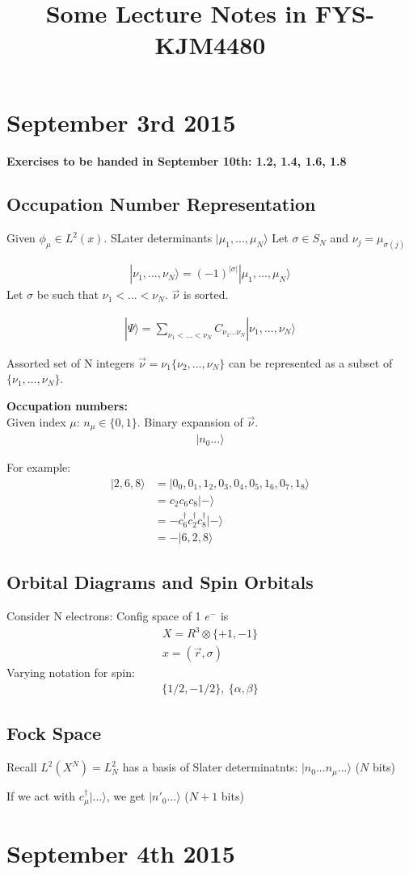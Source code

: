 \documentclass[norsk, 12pt]{article}
\title{Some Lecture Notes in FYS-KJM4480}
\begin{document}
\section{September 3rd 2015}
\label{sec:1}
\textbf{Exercises to be handed in September 10th: 1.2, 1.4, 1.6, 1.8}
\subsection{Occupation Number Representation}
\label{sub:1}
Given $\phi_{\mu} \in L^2(x)$. SLater determinants $|\mu_1,...,\mu_N\rangle$
Let $\sigma \in S_N$ and $\nu_j = \mu_{\sigma(j)}$

\begin{align*}
	|\nu_1, ..., \nu_N\rangle = (-1)^{|\sigma|} |\mu_1,...,\mu_N\rangle
\end{align*}
Let $\sigma$ be such that $\nu_1<...<\nu_N$. $\vec \nu$ is sorted.

\begin{align*}
	|\Psi\rangle = \sum_{\nu_1<...<\nu_N}^{}C_{\nu_1...\nu_N}|\nu_1,...,\nu_N\rangle
\end{align*}

Assorted set of N integers $\vec \nu = \nu_1\{ \nu_2,...,\nu_N \}$
can be represented as a subset of $\{\nu_1,...,\nu_N\}$.

\textbf{Occupation numbers:}\\
Given index $\mu$: $n_{\mu}\in \{ 0,1 \}$. Binary expansion of $\vec \nu$.
\begin{align*}
	|n_0 ...\rangle
\end{align*}

For example:\\
\begin{align*}
	|2,6,8\rangle &= |0_0, 0_1, 1_2, 0_3, 0_4, 0_5, 1_6, 0_7, 1_8\rangle\\
	&= c_2 c_6 c_8|-\rangle\\
	&= -c_6^{\dagger} c_2^{\dagger} c_8^{\dagger}|-\rangle\\
	&=-|6,2,8\rangle
\end{align*}
\subsection{Orbital Diagrams and Spin Orbitals}
\label{sub:}
Consider N electrons: Config space of 1 $e^-$ is
\begin{align*}
	X = R^3 \otimes \{ +1, -1 \}\\
	x = (\vec r, \sigma)
\end{align*}
Varying notation for spin:
\begin{align*}
	\{ 1/2, -1/2\},\: \{\alpha, \beta \}
\end{align*}

\subsection{Fock Space}
Recall $L^2(X^N) = L^2_N$ has a basis of Slater determinatnts: $|n_0...n_{\mu}...\rangle$ ($N$ bits)

If we act with $c^{\dagger}_{\mu}|...\rangle$, we get $|n'_0...\rangle$ ($N+1$ bits)

\section{September 4th 2015}
\end{document}
